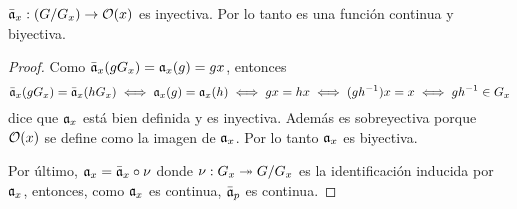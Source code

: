 \begin{ejercicio}\label{ej:31}
  $\bar{\mathfrak{a}}_x:(G/G_x)\rightarrow\mathcal{O}(x)$ es inyectiva. Por lo tanto es una funci\'on continua y
  biyectiva.
\end{ejercicio}
\begin{proof}%
  Como $\bar{\mathfrak{a}}_x(gG_x)=\mathfrak{a}_x(g)=gx$, entonces
  \[
    \bar{\mathfrak{a}}_x(gG_x)=\bar{\mathfrak{a}}_x(hG_x)\iff\mathfrak{a}_x(g)=\mathfrak{a}_x(h)\iff gx=hx \iff (gh^{-1})x=x \iff gh^{-1}\in G_x
  \]
  dice que $\mathfrak{a}_x$ est\'a bien definida y es inyectiva. Adem\'as es sobreyectiva porque $\mathcal{O}(x)$
  se define como la imagen de $\mathfrak{a}_x$. Por lo tanto $\mathfrak{a}_x$ es biyectiva.

  Por \'ultimo, $\mathfrak{a}_x=\bar{\mathfrak{a}}_x\circ\nu$ donde $\nu:G_x\twoheadrightarrow G/G_x$ es la identificaci\'on inducida
  por $\mathfrak{a}_x$, entonces, como $\mathfrak{a}_x$ es continua, $\bar{\mathfrak{a}}_p$ es continua.
\end{proof}%

